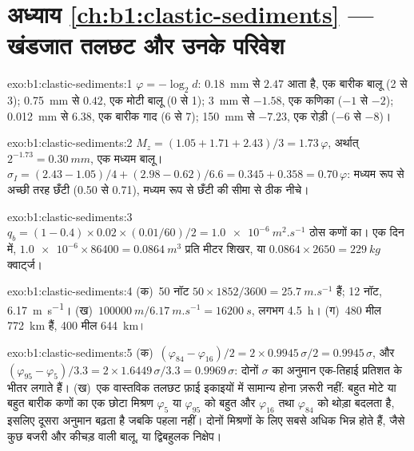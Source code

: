 \section*{अध्याय \ref{ch:b1:clastic-sediments} --- खंडजात तलछट और उनके परिवेश}

\begin{solution}{exo:b1:clastic-sediments:1}
$\varphi = -\log_2 d$: \qty{0.18}{mm} से $2.47$ आता है, एक बारीक बालू (2 से 3);
\qty{0.75}{mm} से $0.42$, एक मोटी बालू (0 से 1); \qty{3}{mm} से
$-1.58$, एक कणिका ($-1$ से $-2$); \qty{0.012}{mm} से $6.38$, एक बारीक गाद (6
से 7); \qty{150}{mm} से $-7.23$, एक रोड़ी ($-6$ से $-8$)।
\end{solution}

\begin{solution}{exo:b1:clastic-sediments:2}
$M_z = (1.05 + 1.71 + 2.43)/3 = 1.73\,\varphi$, अर्थात् $2^{-1.73} =
\qty{0.30}{mm}$, एक मध्यम बालू। $\sigma_I = (2.43 - 1.05)/4 + (2.98 - 0.62)/6.6
= 0.345 + 0.358 = 0.70\,\varphi$: मध्यम रूप से अच्छी तरह छँटी (0.50 से 0.71), मध्यम रूप से छँटी की सीमा से ठीक नीचे।
\end{solution}

\begin{solution}{exo:b1:clastic-sediments:3}
$q_b = (1 - 0.4) \times 0.02 \times (\num{0.01}/60)/2 = \qty{1.0e-6}{m^2.s^{-1}}$
ठोस कणों का। एक दिन में, $\num{1.0e-6} \times 86400 = \qty{0.0864}{m^3}$ प्रति
मीटर शिखर, या $0.0864 \times 2650 = \qty{229}{kg}$ क्वार्ट्ज।
\end{solution}

\begin{solution}{exo:b1:clastic-sediments:4}
(क)~50 नॉट $50 \times 1852/3600 = \qty{25.7}{m.s^{-1}}$ हैं; 12 नॉट,
\qty{6.17}{m.s^{-1}}। (ख)~$\qty{100000}{m}/\qty{6.17}{m.s^{-1}} =
\qty{16200}{s}$, लगभग \qty{4.5}{h}। (ग)~480 मील \qty{772}{km} हैं, 400 मील
\qty{644}{km}।
\end{solution}

\begin{solution}{exo:b1:clastic-sediments:5}
(क)~$(\varphi_{84} - \varphi_{16})/2 = 2 \times 0.9945\,\sigma/2 =
0.9945\,\sigma$, और $(\varphi_{95} - \varphi_5)/3.3 = 2 \times
1.6449\,\sigma/3.3 = 0.9969\,\sigma$: दोनों $\sigma$ का अनुमान एक-तिहाई प्रतिशत के भीतर लगाते हैं। (ख)~एक वास्तविक तलछट फ़ाई इकाइयों में सामान्य होना ज़रूरी नहीं: बहुत मोटे या बहुत बारीक कणों का एक छोटा मिश्रण $\varphi_5$ या
$\varphi_{95}$ को बहुत और $\varphi_{16}$ तथा $\varphi_{84}$ को थोड़ा बदलता है, इसलिए दूसरा अनुमान बढ़ता है जबकि पहला नहीं। दोनों मिश्रणों के लिए सबसे अधिक भिन्न होते हैं, जैसे कुछ बजरी और कीचड़ वाली बालू, या द्विबहुलक निक्षेप।
\end{solution}

